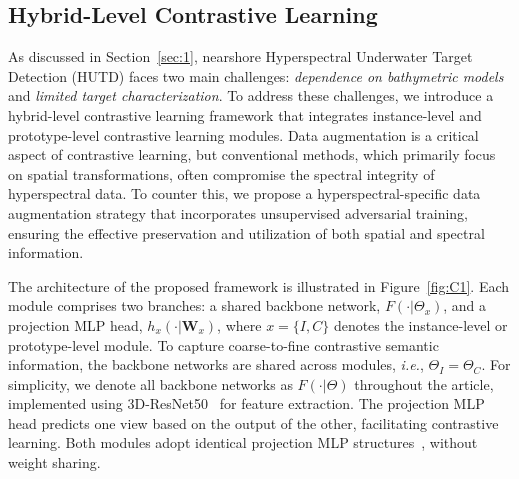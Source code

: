 \subsection{Hybrid-Level Contrastive Learning}\label{sec3.1}
As discussed in Section~\ref{sec:1}, nearshore Hyperspectral Underwater Target Detection (HUTD) faces two main challenges: \emph{dependence on bathymetric models} and \emph{limited target characterization}. 
To address these challenges, we introduce a hybrid-level contrastive learning framework that integrates instance-level and prototype-level contrastive learning modules. 
Data augmentation is a critical aspect of contrastive learning, but conventional methods, which primarily focus on spatial transformations, often compromise the spectral integrity of hyperspectral data. 
To counter this, we propose a hyperspectral-specific data augmentation strategy that incorporates unsupervised adversarial training, ensuring the effective preservation and utilization of both spatial and spectral information.

The architecture of the proposed framework is illustrated in Figure~\ref{fig:C1}. Each module comprises two branches: a shared backbone network, $F(\cdot|\Theta_{x})$, and a projection MLP head, $h_{x}(\cdot|\bm{W}_x)$, where $x = \{I, C\}$ denotes the instance-level or prototype-level module. 
To capture coarse-to-fine contrastive semantic information, the backbone networks are shared across modules, \emph{i.e.}, $\Theta_{I} = \Theta_{C}$. For simplicity, we denote all backbone networks as $F(\cdot|\Theta)$ throughout the article, implemented using 3D-ResNet50~\cite{Jiang2019} for feature extraction. The projection MLP head predicts one view based on the output of the other, facilitating contrastive learning. Both modules adopt identical projection MLP structures~\cite{ChenH21}, without weight sharing.

